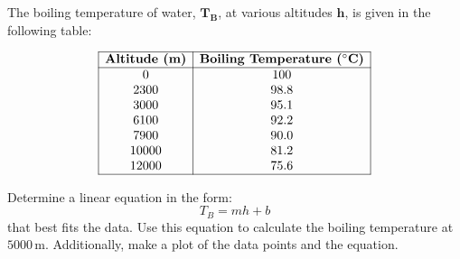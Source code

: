 \documentclass[a4paper, 12pt]{report}
\def\ni{green!60!black!40!white}
\def\link{blue!50!black}
\begin{document}
\begin{tcolorbox}[title={\color{black}\section{Q1}}, colback=white, colframe=\ni, boxrule=1mm, width=1\textwidth]
    The boiling temperature of water, \(\mathbf{T_B}\), at various altitudes \(\mathbf{h}\), is given in the following table:
    
    \[
    \begin{array}{|c|c|}
        \hline
        \textbf{Altitude (m)} & \textbf{Boiling Temperature (\(^\circ\text{C}\))} \\ \hline
        0 & 100 \\ 
        2300 & 98.8 \\ 
        3000 & 95.1 \\ 
        6100 & 92.2 \\ 
        7900 & 90.0 \\ 
        10000 & 81.2 \\ 
        12000 & 75.6 \\ \hline
    \end{array}
    \]
    
    Determine a linear equation in the form:
    \[
    T_B = mh + b
    \]
    that best fits the data. Use this equation to calculate the boiling temperature at \(5000 \, \text{m}\). Additionally, make a plot of the data points and the equation.
\end{tcolorbox}



\newpage
\end{document}
